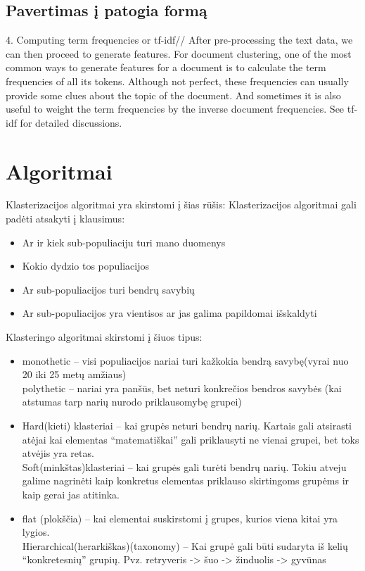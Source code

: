 \documentclass{VUMIFInfKursinis}
\begin{document}
\subsection{Pavertimas į patogia formą}
4. Computing term frequencies or tf-idf//
After pre-processing the text data, we can then proceed to generate features. For document clustering, one of the most common ways to generate features for a document is to calculate the term frequencies of all its tokens. Although not perfect, these frequencies can usually provide some clues about the topic of the document. And sometimes it is also useful to weight the term frequencies by the inverse document frequencies. See tf-idf for detailed discussions.

\section{Algoritmai}
Klasterizacijos algoritmai yra skirstomi į šias rūšis:
Klasterizacijos algoritmai gali padėti atsakyti į klausimus:
\begin{itemize}
	\item Ar ir kiek sub-populiaciju turi mano duomenys
	\item Kokio dydzio tos populiacijos
	\item Ar sub-populiacijos turi bendrų savybių
	\item Ar sub-populiacijos yra vientisos ar jas galima papildomai išskaldyti
\end{itemize}
Klasteringo algoritmai skirstomi į šiuos tipus:
\begin{itemize}
	\item monothetic – visi populiacijos nariai turi kažkokia bendrą savybę(vyrai nuo 20 iki 25 metų amžiaus)
\\polythetic – nariai yra panšūs, bet neturi konkrečios bendros savybės (kai atstumas tarp narių nurodo priklausomybę grupei)
	\item Hard(kieti) klasteriai – kai grupės neturi bendrų narių. Kartais gali atsirasti atėjai kai elementas “matematiškai” gali priklausyti ne vienai grupei, bet toks atvėjis yra retas.
\\Soft(minkštas)klasteriai – kai grupės gali turėti bendrų narių. Tokiu atveju galime nagrinėti kaip konkretus elementas priklauso skirtingoms grupėms ir kaip gerai jas atitinka.
	\item flat (plokščia) – kai elementai suskirstomi į grupes, kurios viena kitai yra lygios.
\\Hierarchical(herarkiškas)(taxonomy) – Kai grupė gali būti sudaryta iš kelių “konkretesnių” grupių. Pvz. retryveris -> šuo -> žinduolis -> gyvūnas
\end{itemize}
\end{document}
